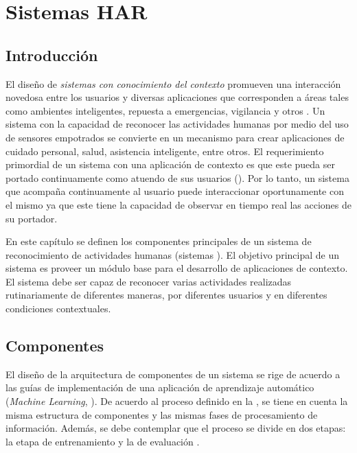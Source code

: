 
\chapter{Sistemas HAR }

\label{chap4:sistemas-de-reconocimiento}

\section{Introducción}

\label{sec41:introduccion}El diseño de \emph{sistemas con conocimiento
del contexto} promueven una interacción novedosa entre los usuarios
y diversas aplicaciones que corresponden a áreas tales como ambientes
inteligentes, repuesta a emergencias, vigilancia y otros \cite{Choudhury2008}.
Un sistema con la capacidad de reconocer las actividades humanas por
medio del uso de sensores empotrados se convierte en un mecanismo
para crear aplicaciones de cuidado personal, salud, asistencia inteligente,
entre otros. El requerimiento primordial de un sistema con una aplicación
de contexto es que este pueda ser portado continuamente como atuendo
de sus usuarios (). Por lo tanto, un sistema que
acompaña continuamente al usuario puede interaccionar oportunamente
con el mismo ya que este tiene la capacidad de observar en tiempo
real las acciones de su portador. 

En este capítulo se definen los componentes principales de un sistema
de reconocimiento de actividades humanas (sistemas ). El
objetivo principal de un sistema  es proveer un módulo
base para el desarrollo de aplicaciones de contexto. El sistema debe
ser capaz de reconocer varias actividades realizadas rutinariamente
de diferentes maneras, por diferentes usuarios y en diferentes condiciones
contextuales. 

\section{Componentes}

\label{sec42:componentes}El diseño de la arquitectura de componentes
de un sistema  se rige de acuerdo a las guías de implementación
de una aplicación de aprendizaje automático (\emph{Machine Learning},
). De acuerdo al proceso definido en la ,
se tiene en cuenta la misma estructura de componentes y las mismas
fases de procesamiento de información. Además, se debe contemplar
que el proceso se divide en dos etapas: la etapa de entrenamiento
y la de evaluación \cite{LaraLabrador2013}.

